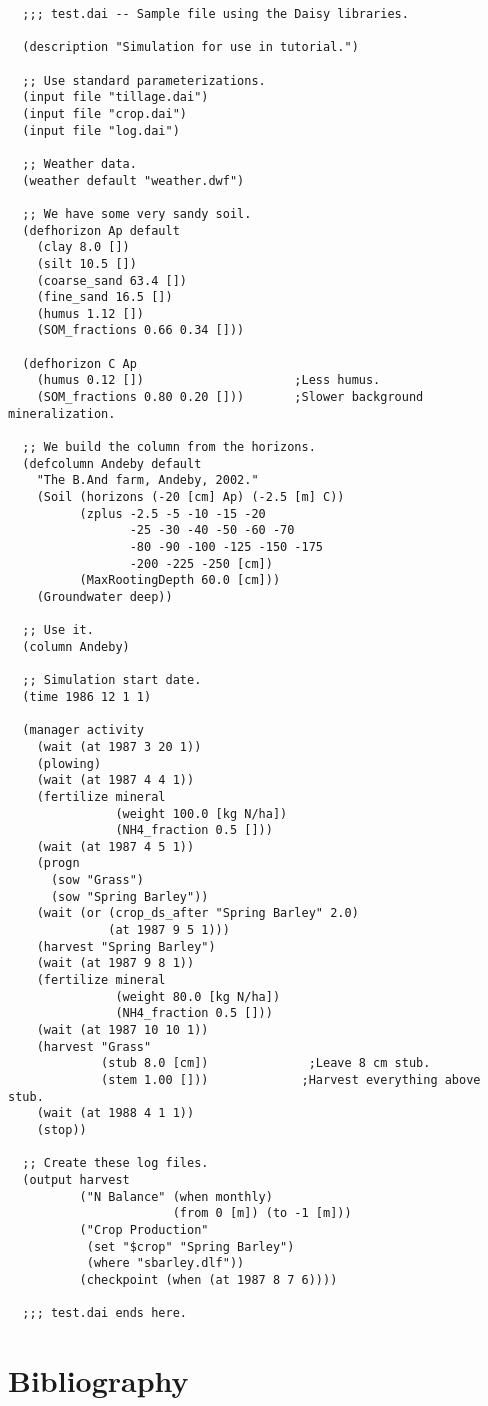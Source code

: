 \documentclass[a4paper,11pt]{article}
\begin{document}
\begin{verbatim}
  ;;; test.dai -- Sample file using the Daisy libraries.

  (description "Simulation for use in tutorial.")

  ;; Use standard parameterizations.
  (input file "tillage.dai")
  (input file "crop.dai")
  (input file "log.dai")

  ;; Weather data.
  (weather default "weather.dwf")

  ;; We have some very sandy soil.
  (defhorizon Ap default
    (clay 8.0 [])
    (silt 10.5 [])
    (coarse_sand 63.4 [])
    (fine_sand 16.5 [])
    (humus 1.12 [])
    (SOM_fractions 0.66 0.34 []))

  (defhorizon C Ap
    (humus 0.12 [])                     ;Less humus.
    (SOM_fractions 0.80 0.20 []))       ;Slower background mineralization.

  ;; We build the column from the horizons.
  (defcolumn Andeby default
    "The B.And farm, Andeby, 2002."
    (Soil (horizons (-20 [cm] Ap) (-2.5 [m] C))
          (zplus -2.5 -5 -10 -15 -20
                 -25 -30 -40 -50 -60 -70
                 -80 -90 -100 -125 -150 -175
                 -200 -225 -250 [cm])
          (MaxRootingDepth 60.0 [cm]))
    (Groundwater deep))

  ;; Use it.
  (column Andeby)

  ;; Simulation start date.
  (time 1986 12 1 1)

  (manager activity
    (wait (at 1987 3 20 1))
    (plowing)
    (wait (at 1987 4 4 1))
    (fertilize mineral
               (weight 100.0 [kg N/ha])
               (NH4_fraction 0.5 []))
    (wait (at 1987 4 5 1))
    (progn
      (sow "Grass")
      (sow "Spring Barley"))
    (wait (or (crop_ds_after "Spring Barley" 2.0)
              (at 1987 9 5 1)))
    (harvest "Spring Barley")
    (wait (at 1987 9 8 1))
    (fertilize mineral
               (weight 80.0 [kg N/ha])
               (NH4_fraction 0.5 []))
    (wait (at 1987 10 10 1))
    (harvest "Grass"
             (stub 8.0 [cm])              ;Leave 8 cm stub.
             (stem 1.00 []))             ;Harvest everything above stub.
    (wait (at 1988 4 1 1))
    (stop))

  ;; Create these log files.
  (output harvest
          ("N Balance" (when monthly)
                       (from 0 [m]) (to -1 [m]))
          ("Crop Production"
           (set "$crop" "Spring Barley")
           (where "sbarley.dlf"))
          (checkpoint (when (at 1987 8 7 6))))

  ;;; test.dai ends here.
\end{verbatim}

\section{Bibliography}

\end{document}
